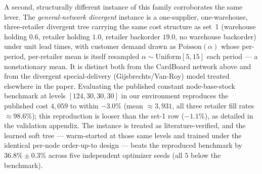\documentclass[11pt]{article}
\begin{document}
A second, structurally different instance of this family corroborates the same lever. The
\emph{general-network divergent} instance is a one-supplier,
one-warehouse, three-retailer divergent tree carrying the same \citet{kunnumkal2011} cost
structure as set~1 (warehouse holding $0.6$, retailer holding $1.0$, retailer backorder $19.0$,
no warehouse backorder) under unit lead times, with customer demand drawn as
$\mathrm{Poisson}(\alpha)$ whose per-period, per-retailer mean is itself resampled
$\alpha\sim\mathrm{Uniform}[5,15]$ each period --- a nonstationary mean. It is distinct both from the
CardBoard network above and from the divergent special-delivery (Gijsbrechts/Van-Roy) model treated
elsewhere in the paper.
Evaluating the published constant node-base-stock benchmark at levels $[124,30,30,30]$ in our
environment reproduces the published cost $4{,}059$ to within $-3.0\%$ (mean $\approx 3{,}931$, all
three retailer fill rates $\approx 98.6\%$); this reproduction is looser than the set-1 row
($-1.1\%$), as detailed in the validation appendix. The instance is treated as literature-verified, and
the learned soft tree --- warm-started at those same levels and trained under the identical
per-node order-up-to design --- beats the reproduced benchmark by $36.8\%\pm0.3\%$ across five
independent optimizer seeds (all $5$ below the benchmark).
\end{document}

